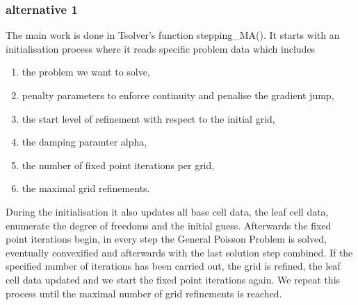 \subsubsection{alternative 1}
The main work is done in Tsolver's function stepping\_MA(). It starts with an initialisation process where it reads specific problem data which includes
\begin{enumerate}
 \item  the problem we want to solve,
 \item penalty parameters to enforce continuity and penalise the gradient jump,
 \item the start level of refinement with respect to the initial grid,
 \item the damping paramter alpha,
 \item the number of fixed point iterations per grid,
 \item the maximal grid refinements.
\end{enumerate}
During the initialisation it also updates all base cell data, the leaf cell data, enumerate the degree of freedoms and the initial guess.
Afterwards the fixed point iterations begin, in every step the General Poisson Problem is solved, eventually convexified and afterwards with the last solution step combined. If the specified number of iterations has been carried out, the grid is refined, the leaf cell data updated and we start the fixed point iterations again.
We repeat this process until the maximal number of grid refinements is reached.


